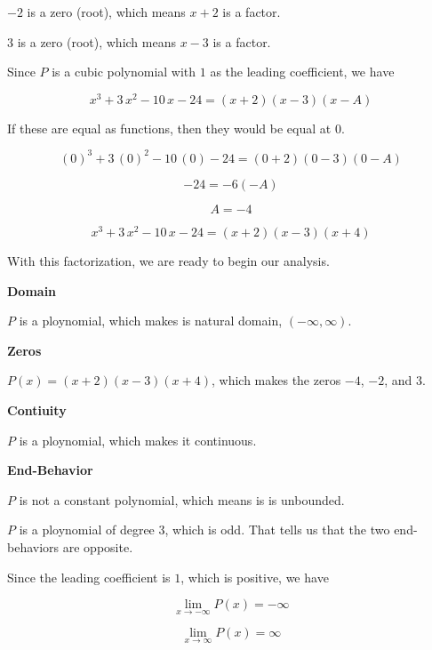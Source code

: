 \documentclass{ximera}
\begin{document}
$-2$ is a zero (root), which means $x+2$ is a factor. 

$3$ is a zero (root), which means $x-3$ is a factor. 


Since $P$ is a cubic polynomial with $1$ as the leading coefficient, we have

\[
x^3 + 3 \, x^2 - 10 \, x - 24 = (x+2) (x-3) (x-A)
\]

If these are equal as functions, then they would be equal at $0$.


\[
(0)^3 + 3 \, (0)^2 - 10 \, (0) - 24 = (0+2) (0-3) (0-A)
\]


\[
-24 = -6 (-A)
\]


\[
A = -4
\]



\[
x^3 + 3 \, x^2 - 10 \, x - 24 = (x+2) (x-3) (x+4)
\]



With this factorization, we are ready to begin our analysis. 



\textbf{Domain}

$P$ is a ploynomial, which makes is natural domain, $(-\infty, \infty)$. 





\textbf{Zeros}

$P(x) = (x+2) (x-3) (x+4)$, which makes the zeros $-4$, $-2$, and $3$. 





\textbf{Contiuity}

$P$ is a ploynomial, which makes it continuous. 







\textbf{End-Behavior}


$P$ is not a constant polynomial, which means is is unbounded. 

$P$ is a ploynomial of degree $3$, which is odd.  That tells us that the two end-behaviors are opposite. 

Since the leading coefficient is $1$, which is positive, we have


\[
\lim\limits_{x \to -\infty} P(x) = -\infty 
\]




\[
\lim\limits_{x \to \infty} P(x) = \infty 
\]
\end{document}
